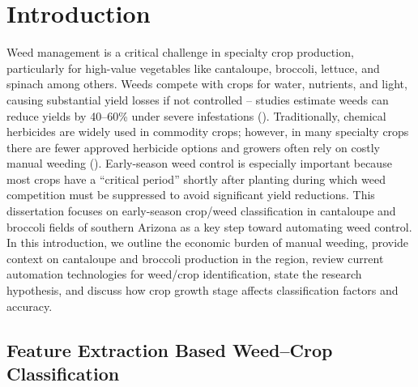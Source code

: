 \documentclass[letterpaper]{report}
\begin{document}
\chapter{Introduction}
Weed management is a critical challenge in specialty crop production, particularly for high-value vegetables like cantaloupe, broccoli, lettuce, and spinach among others. Weeds compete with crops for water, nutrients, and light, causing substantial yield losses if not controlled – studies estimate weeds can reduce yields by 40–60\% under severe infestations (\cite{Garibaldi-Marquez2022-yn}). Traditionally, chemical herbicides are widely used in commodity crops; however, in many specialty crops there are fewer approved herbicide options and growers often rely on costly manual weeding (\cite{American-Society-of-Agronomy2018-ad}). Early-season weed control is especially important because most crops have a “critical period” shortly after planting during which weed competition must be suppressed to avoid significant yield reductions. This dissertation focuses on early-season crop/weed classification in cantaloupe and broccoli fields of southern Arizona as a key step toward automating weed control. In this introduction, we outline the economic burden of manual weeding, provide context on cantaloupe and broccoli production in the region, review current automation technologies for weed/crop identification, state the research hypothesis, and discuss how crop growth stage affects classification factors and accuracy.

\section{Feature Extraction Based Weed–Crop Classification}
\end{document}
